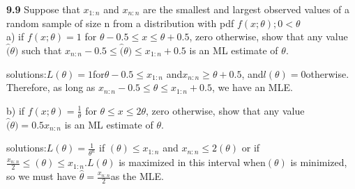 \noindent \textbf{9.9} Suppose that $x_{1:n}$ and $x_{n:n}$ are the smallest and largest observed values of a random sample of size n from a distribution with pdf $f(x;\theta); 0<\theta$\\

a) if $f(x;\theta)=1$ for $\theta-0.5 \le x \le \theta +0.5$, zero otherwise, show that any value $\hat(\theta)$ such that $x_{n:n}-0.5 \le \hat(\theta) \le x_{1:n}+0.5$ is an ML estimate of $\theta$.


solutions:$L(\theta )=1 $for$\theta-0.5\le { x }_{ 1:n }$ and$ { x }_{ n:n }\ge \theta +0.5$, and$ l(\theta) = 0 $otherwise. Therefore, as long as $ {x}_{n:n}-0.5 \le \hat { \theta  } \le {x}_{1:n}+0.5$, we have an MLE.



b) if $f(x;\theta)=\frac{1}{\theta}$ for $\theta \le x \le 2\theta$, zero otherwise, show that any value $\hat(\theta)=0.5x_{n:n}$ is an ML estimate of $\theta$.

solutions:$ L(\theta)=\frac { 1 }{ { \theta  }^{ n } }$ if $(\theta) \le {x}_{1:n}$ and ${x}_{n:n}\le 2(\theta) $ or if$ \frac { { x }_{ n:n } }{ 2 } \le (\theta) \le {x}_{1:n}. L(\theta)$ is maximized in this interval when$ (\theta)$ is minimized, so we must have $\hat { \theta  } = \frac { { x }_{ n:n } }{ 2 } $as the MLE.
